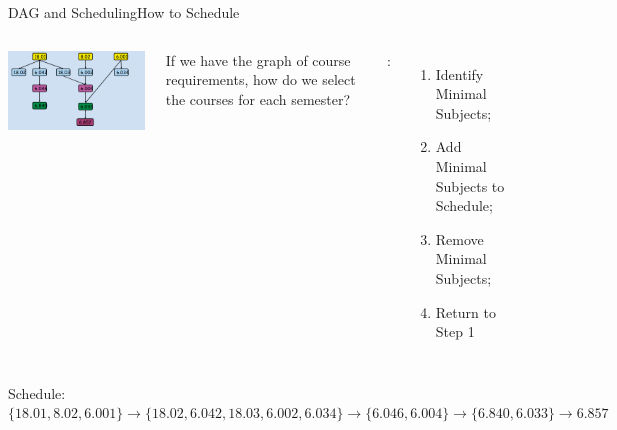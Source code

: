 \begin{frame}{DAG and Scheduling}{How to Schedule}

  \begin{columns}
      \includegraphics[width=1\textwidth]{../img/greedy_schedule}

      If we have the graph of course requirements, how do we select the courses for each semester? \medskip

      :
      \begin{enumerate}
      \item Identify Minimal Subjects;
      \item Add Minimal Subjects to Schedule;
      \item Remove Minimal Subjects;
      \item Return to Step 1
      \end{enumerate}
  \end{columns}\medskip

  Schedule:\\
  $\{18.01, 8.02, 6.001\} \to \{18.02, 6.042, 18.03, 6.002, 6.034\} \to \{6.046, 6.004\} \to \{ 6.840, 6.033\} \to 6.857$
\end{frame}


